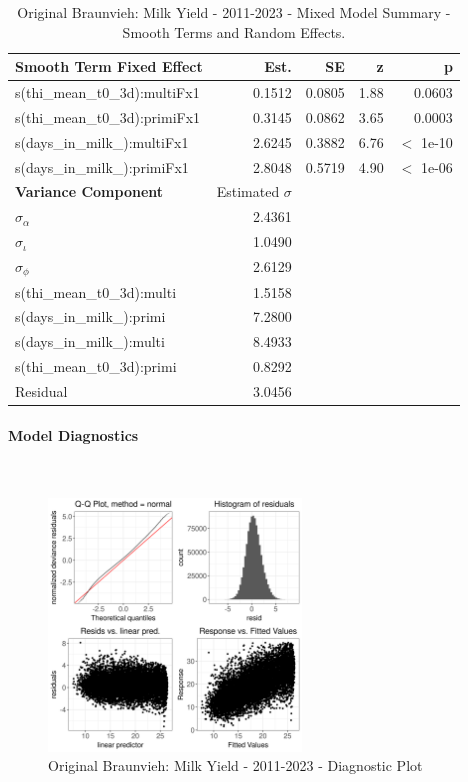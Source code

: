 \newpage
\begin{table}[H]
\centering
\begin{tabular}
{l | r | r | r | r}
\textbf{Smooth Term Fixed Effect} & Est. & SE & z & p\\
\hline
\hline
s(thi\_mean\_t0\_3d):multiFx1 & 0.1512 & 0.0805 & 1.88 & 0.0603\\
s(thi\_mean\_t0\_3d):primiFx1 & 0.3145 & 0.0862 & 3.65 & 0.0003\\
s(days\_in\_milk\_):multiFx1 & 2.6245 & 0.3882 & 6.76 & $<$ 1e-10\\
s(days\_in\_milk\_):primiFx1 & 2.8048 & 0.5719 & 4.90 & $<$ 1e-06\\
\hline
\textbf{Variance Component} & Estimated $\sigma$ & & & \\
\hline
\hline
$\sigma_\alpha$ & 2.4361 & & & \\
$\sigma_\iota$ & 1.0490 & & & \\
$\sigma_\phi$ & 2.6129 & & & \\
s(thi\_mean\_t0\_3d):multi &  1.5158 & & & \\
s(days\_in\_milk\_):primi & 7.2800 & & & \\
s(days\_in\_milk\_):multi & 8.4933 & & & \\
s(thi\_mean\_t0\_3d):primi & 0.8292 & & & \\
Residual & 3.0456 & & & \\
\end{tabular}
\caption[]{Original Braunvieh: Milk Yield - 2011-2023 - Mixed Model Summary - Smooth Terms and Random Effects.}
\end{table}


\paragraph{Model Diagnostics} \quad \\
\begin{figure}[H]
    \centering
    \includegraphics[width=0.6\textwidth]{thesis/figures/models/milk/after2010/ob_milk_after2010/ob_milk_after2010_diagnostics.png}
    \caption[]{Original Braunvieh: Milk Yield - 2011-2023 - Diagnostic Plot}
\end{figure}

